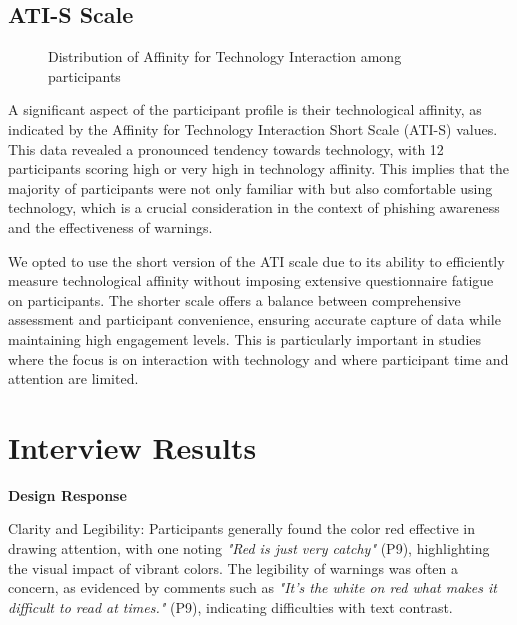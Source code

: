 \documentclass[
  a4paper,  %
  twoside,  %
  bibliography=totoc,
  headsepline,
  cleardoublepage=empty,
  parskip=half,
  draft=false
]{scrbook}
\begin{document}
\subsection{ATI-S Scale}

\begin{figure}[H]
\centering
{}
\caption{Distribution of Affinity for Technology Interaction among participants}
\label{ati}
\end{figure}

A significant aspect of the participant profile is their technological affinity, as indicated by the Affinity for Technology Interaction Short Scale (ATI-S) values. This data revealed a pronounced tendency towards technology, with 12 participants scoring high or very high in technology affinity. This implies that the majority of participants were not only familiar with but also comfortable using technology, which is a crucial consideration in the context of phishing awareness and the effectiveness of warnings.

We opted to use the short version of the ATI scale due to its ability to efficiently measure technological affinity without imposing extensive questionnaire fatigue on participants. The shorter scale offers a balance between comprehensive assessment and participant convenience, ensuring accurate capture of data while maintaining high engagement levels. This is particularly important in studies where the focus is on interaction with technology and where participant time and attention are limited.

\section{Interview Results}

\textbf{Design Response}

Clarity and Legibility: Participants generally found the color red effective in drawing attention, with one noting \textit{"Red is just very catchy"} (P9), highlighting the visual impact of vibrant colors. The legibility of warnings was often a concern, as evidenced by comments such as \textit{"It’s the white on red what makes it difficult to read at times."} (P9), indicating difficulties with text contrast. %
    
\end{document}

